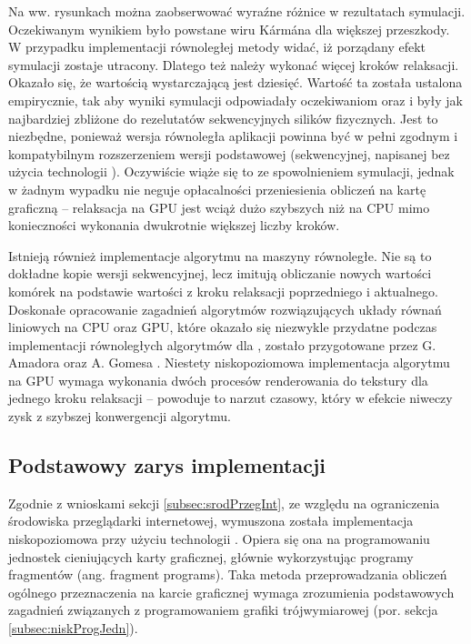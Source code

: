 Na ww. rysunkach można zaobserwować wyraźne różnice w rezultatach symulacji.
Oczekiwanym wynikiem było powstane wiru Kármána dla większej przeszkody. W
przypadku implementacji równoległej metody  widać, iż porządany
efekt symulacji zostaje utracony. Dlatego też należy wykonać więcej kroków
relaksacji. Okazało się, że wartością wystarczającą jest dziesięć. Wartość ta
została ustalona empirycznie, tak aby wyniki symulacji odpowiadały
oczekiwaniom oraz i były jak najbardziej zbliżone do rezelutatów sekwencyjnych
silików fizycznych. Jest to niezbędne, ponieważ wersja równoległa aplikacji
\en powinna być w pełni zgodnym i kompatybilnym rozszerzeniem wersji
podstawowej (sekwencyjnej, napisanej bez użycia technologii ).
Oczywiście wiąże się to ze spowolnieniem symulacji, jednak w żadnym wypadku
nie neguje opłacalności przeniesienia obliczeń na kartę graficzną --
relaksacja na GPU jest wciąż dużo szybszych niż na CPU mimo konieczności
wykonania dwukrotnie większej liczby kroków.

Istnieją również implementacje algorytmu  na maszyny
równoległe. Nie są to dokładne kopie wersji sekwencyjnej, lecz imitują
obliczanie nowych wartości komórek na podstawie wartości z kroku relaksacji
poprzedniego i aktualnego. Doskonałe opracowanie zagadnień algorytmów
rozwiązujących układy równań liniowych na CPU oraz GPU, które okazało się
niezwykle przydatne podczas implementacji równoległych algorytmów dla \en,
zostało przygotowane przez G. Amadora oraz A. Gomesa \cite{LinSolvers}.
Niestety niskopoziomowa implementacja algorytmu  na GPU
wymaga wykonania dwóch procesów renderowania do tekstury dla jednego kroku
relaksacji -- powoduje to narzut czasowy, który w efekcie niweczy zysk z
szybszej konwergencji algorytmu.

\subsection{Podstawowy zarys implementacji}

Zgodnie z wnioskami sekcji \ref{subsec:srodPrzegInt}, ze względu na ograniczenia
środowiska przeglądarki internetowej, wymuszona została implementacja
niskopoziomowa przy użyciu technologii . Opiera się ona na
programowaniu jednostek cieniujących karty graficznej, głównie wykorzystując
programy fragmentów (ang. fragment programs). Taka metoda przeprowadzania
obliczeń ogólnego przeznaczenia na karcie graficznej wymaga zrozumienia
podstawowych zagadnień związanych z programowaniem grafiki trójwymiarowej (por.
sekcja \ref{subsec:niskProgJedn}).

